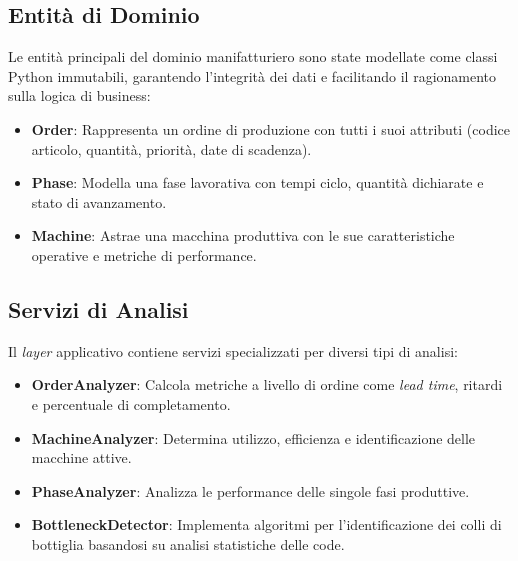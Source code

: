 \begin{listing}[H]
\caption{Struttura del servizio Analytics}
\label{listing:analytics-structure}
\end{listing}

\subsection{Entità di Dominio}
Le entità principali del dominio manifatturiero sono state modellate come classi Python immutabili, garantendo l'integrità dei dati e facilitando il ragionamento sulla logica di business:

\begin{itemize}
    \item \textbf{Order}: Rappresenta un ordine di produzione con tutti i suoi attributi (codice articolo, quantità, priorità, date di scadenza).
    \item \textbf{Phase}: Modella una fase lavorativa con tempi ciclo, quantità dichiarate e stato di avanzamento.
    \item \textbf{Machine}: Astrae una macchina produttiva con le sue caratteristiche operative e metriche di performance.
\end{itemize}

\subsection{Servizi di Analisi}
Il \textit{layer} applicativo contiene servizi specializzati per diversi tipi di analisi:

\begin{itemize}
    \item \textbf{OrderAnalyzer}: Calcola metriche a livello di ordine come \textit{lead time}, ritardi e percentuale di completamento.
    \item \textbf{MachineAnalyzer}: Determina utilizzo, efficienza e identificazione delle macchine attive.
    \item \textbf{PhaseAnalyzer}: Analizza le performance delle singole fasi produttive.
    \item \textbf{BottleneckDetector}: Implementa algoritmi per l'identificazione dei colli di bottiglia basandosi su analisi statistiche delle code.
\end{itemize}

